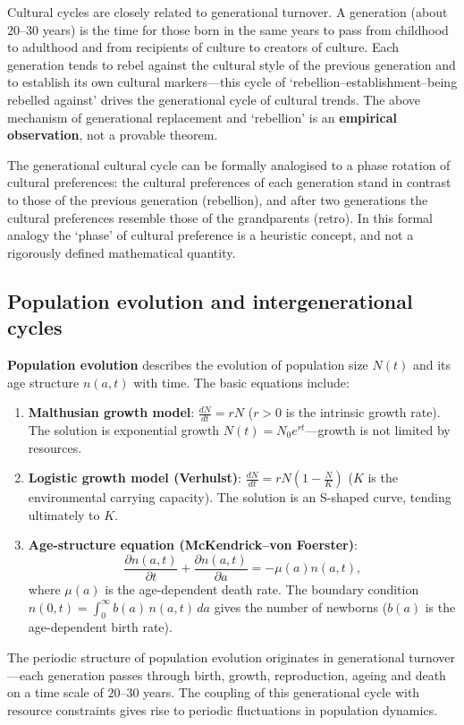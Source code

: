 \begin{remark}\label{prop:generational_cycle}
Cultural cycles are closely related to generational turnover. A generation (about $20$--$30$ years) is the time for those born in the same years to pass from childhood to adulthood and from recipients of culture to creators of culture. Each generation tends to rebel against the cultural style of the previous generation and to establish its own cultural markers---this cycle of `rebellion--establishment--being rebelled against' drives the generational cycle of cultural trends. The above mechanism of generational replacement and `rebellion' is an \textbf{empirical observation}, not a provable theorem.

The generational cultural cycle can be formally analogised to a phase rotation of cultural preferences: the cultural preferences of each generation stand in contrast to those of the previous generation (rebellion), and after two generations the cultural preferences resemble those of the grandparents (retro). In this formal analogy the `phase' of cultural preference is a heuristic concept, and not a rigorously defined mathematical quantity.
\end{remark}

\subsection{Population evolution and intergenerational cycles}

\begin{definition}\label{def:population_evolution}
\textbf{Population evolution} describes the evolution of population size $N(t)$ and its age structure $n(a,t)$ with time. The basic equations include:
\begin{enumerate}[label=(\roman*)]
    \item \textbf{Malthusian growth model}: $\frac{dN}{dt} = rN$ ($r > 0$ is the intrinsic growth rate). The solution is exponential growth $N(t) = N_0 e^{rt}$---growth is not limited by resources.
    \item \textbf{Logistic growth model (Verhulst)}: $\frac{dN}{dt} = rN\left(1 - \frac{N}{K}\right)$ ($K$ is the environmental carrying capacity). The solution is an S-shaped curve, tending ultimately to $K$.
    \item \textbf{Age-structure equation (McKendrick--von Foerster)}:
    \[
    \frac{\partial n(a,t)}{\partial t} + \frac{\partial n(a,t)}{\partial a} = -\mu(a) n(a,t),
    \]
    where $\mu(a)$ is the age-dependent death rate. The boundary condition $n(0,t) = \int_0^\infty b(a)\, n(a,t)\, da$ gives the number of newborns ($b(a)$ is the age-dependent birth rate).
\end{enumerate}
The periodic structure of population evolution originates in generational turnover---each generation passes through birth, growth, reproduction, ageing and death on a time scale of $20$--$30$ years. The coupling of this generational cycle with resource constraints gives rise to periodic fluctuations in population dynamics.
\end{definition}

